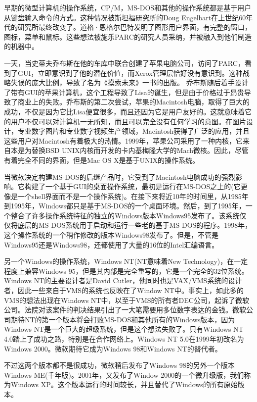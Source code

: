 	早期的微型计算机的操作系统，CP/M，MS-DOS和其他的操作系统都是基于用户从键盘输入命令的方式。这种情况被斯坦福研究所的Doug Engelbart在上世纪60年代的研究所最终改变了。道格·恩格尔巴特发明了图形用户界面，有完整的窗口，图标，菜单和鼠标。这些想法被施乐PARC的研究人员采纳，并被融入到他们制造的机器中。
	
	一天，当史蒂夫乔布斯在他的车库中联合创建了苹果电脑公司，访问了PARC，看到了GUI，立即意识到了他的潜在价值，而Xerox管理层恰好没有意识到。这种战略失误的庞大比例，导致了名为《摸索未来》一书的出版。
	乔布斯随后着手设计了带有GUI的苹果计算机，这个工程导致了Lisa的诞生，但是由于价格过于昂贵导致了商业上的失败。乔布斯的第二次尝试，苹果的Macintosh电脑，取得了巨大的成功，不仅是因为它比Lisa便宜很多，而且还因为它是用户友好的。这就意味着它的用户不仅可以对计算机一无所知，而且可以完全没有任何学习的意图。在图片设计，专业数字图片和专业数字视频生产领域，Macintosh获得了广泛的应用，并且这些用户对Macintosh有着极大的热情。1999年，苹果公司采用了一种内核，它来自本是为替换BSD UNIX内核而开发的卡内基梅隆大学的Mach微核。因此，尽管有着完全不同的界面，但是Mac OS X是基于UNIX的操作系统。
	
	当微软决定构建MS-DOS的后继产品时，它受到了Macintosh电脑成功的强烈影响。它构建了一个基于GUI的桌面操作系统，最初是运行在MS-DOS之上的(它更像是一个shell界面而不是一个操作系统)。在接下来将近10年的时间里，从1985年到1995年，Windows都只是基于MS-DOS的一个桌面环境。然后，到了1995年，一个整合了许多操作系统特征的独立的Windows版本Windows95发布了。该系统仅仅将底层的MS-DOS系统用于启动和运行一些老的基于MS-DOS的程序。1998年，这个操作系统的一个稍作修改的版本Windows98发布了。但是，不管是Windows95还是Windows98，还都使用了大量的16位的Intel汇编语言。
	
	另一个Windows的操作系统，Windows NT(NT意味着New Technology)，在一定程度上兼容Windows 95，但是其内部是完全重写的，它是一个完全的32位系统。Windows NT的主要设计者是David Cutler，他同时也是VAX/VMS系统的设计者，因此一些来自于VMS的系统也反映在了Window NT中。事实上，如此多的VMS的想法出现在Windows NT中，以至于VMS的所有者DEC公司，起诉了微软公司。法院对该案件的判决结果引出了一大笔需要用多位数字表达的金钱。微软公司期待NT的第一个版本将会打败MS-DOS和其他所有的Windows版本，因为Windows NT是一个巨大的超级系统，但是这个想法失败了。只有Windows NT 4.0踏上了成功之路，特别是在合作网络上。Windows NT 5.0在1999年初改名为Windows 2000。微软期待它成为Windows 98和Windows NT的替代者。
	
	不过这两个版本都不是很成功，微软稍后发布了Windows 98的另外一个版本Windows ME(千年版)。2001年，又发布了Window 2000的一个微升级版，我们称为Windows XP。这个版本运行的时间较长，并且替代了Windows的所有原始版本。
	
